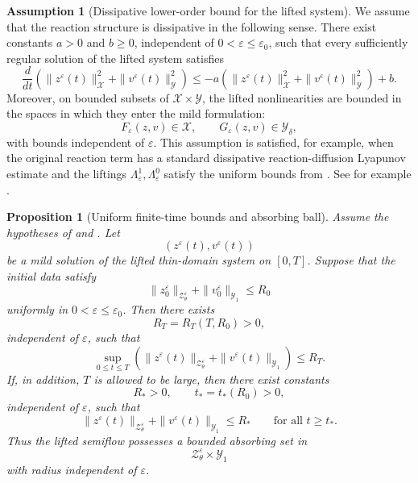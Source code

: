 \documentclass[11pt]{article}
\newtheorem{proposition}[theorem]{Proposition}
\theoremstyle{definition}
\newtheorem{assumption}[theorem]{Assumption}
\theoremstyle{remark}
\numberwithin{equation}{section}
\begin{document}
\begin{assumption}[Dissipative lower-order bound for the lifted system]
\label{ass:dissipative-lifted-bound}
We assume that the reaction structure is dissipative in the following sense.
There exist constants \(a>0\) and \(b\ge0\), independent of
\(0<\varepsilon\le\varepsilon_0\), such that every sufficiently regular
solution of the lifted system satisfies
\[
\frac{d}{dt}
\left(
\|z^\varepsilon(t)\|_{\mathcal X}^2
+
\|v^\varepsilon(t)\|_{\mathcal Y}^2
\right)
\le
-a
\left(
\|z^\varepsilon(t)\|_{\mathcal X}^2
+
\|v^\varepsilon(t)\|_{\mathcal Y}^2
\right)
+b.
\]
Moreover, on bounded subsets of
\(\mathcal X\times\mathcal Y\), the lifted nonlinearities are bounded in the
spaces in which they enter the mild formulation:
\[
F_\varepsilon(z,v)\in\mathcal X,
\qquad
G_\varepsilon(z,v)\in\mathcal Y_\delta,
\]
with bounds independent of \(\varepsilon\). This assumption is satisfied, for
example, when the original reaction term has a standard dissipative
reaction-diffusion Lyapunov estimate and the liftings
\(\Lambda_\varepsilon^1,\Lambda_\varepsilon^0\) satisfy the uniform bounds from
. See for example \cite{Rothe1984,hollis1987global,Morgan1989}.
\end{assumption}

\begin{proposition}[Uniform finite-time bounds and absorbing ball]
\label{prop:full-lifted-uniform-bound}
Assume the hypotheses of  and
. Let
\[
(z^\varepsilon(t),v^\varepsilon(t))
\]
be a mild solution of the lifted thin-domain system on \([0,T]\). Suppose that
the initial data satisfy
\[
\|z_0^\varepsilon\|_{\mathcal Z_\theta^\varepsilon}
+
\|v_0^\varepsilon\|_{\mathcal Y_1}
\le R_0
\]
uniformly in \(0<\varepsilon\le\varepsilon_0\). Then there exists
\[
R_T=R_T(T,R_0)>0,
\]
independent of \(\varepsilon\), such that
\[
\sup_{0\le t\le T}
\left(
\|z^\varepsilon(t)\|_{\mathcal Z_\theta^\varepsilon}
+
\|v^\varepsilon(t)\|_{\mathcal Y_1}
\right)
\le R_T.
\]
If, in addition, \(T\) is allowed to be large, then there exist constants
\[
R_*>0,
\qquad
t_*=t_*(R_0)>0,
\]
independent of \(\varepsilon\), such that
\[
\|z^\varepsilon(t)\|_{\mathcal Z_\theta^\varepsilon}
+
\|v^\varepsilon(t)\|_{\mathcal Y_1}
\le R_*
\qquad
\text{for all }t\ge t_*.
\]
Thus the lifted semiflow possesses a bounded absorbing set in
\[
\mathcal Z_\theta^\varepsilon\times\mathcal Y_1
\]
with radius independent of \(\varepsilon\).
\end{proposition}
\end{document}
